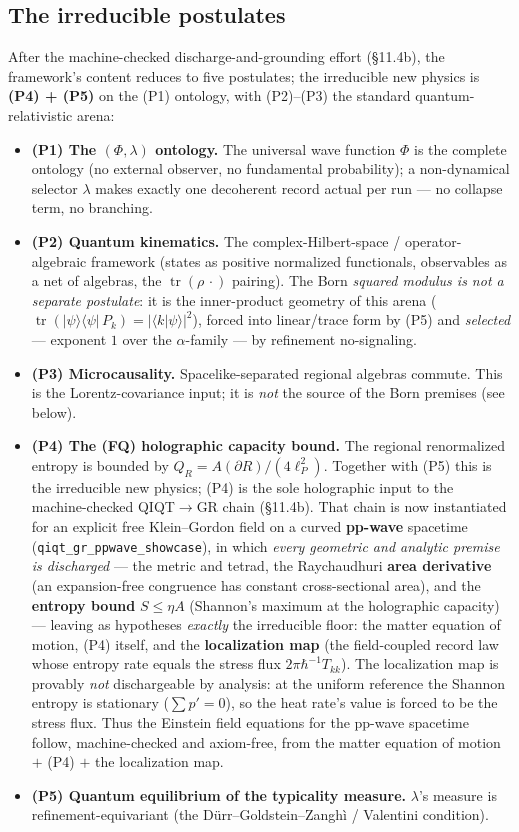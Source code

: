 \documentclass[11pt,a4paper]{article}
\begin{document}
\subsection{The irreducible postulates}

After the machine-checked discharge-and-grounding effort (§11.4b), the framework's content reduces to five postulates; the irreducible new physics is \textbf{(P4) + (P5)} on the (P1) ontology, with (P2)–(P3) the standard quantum-relativistic arena:

\begin{itemize}
  \item \textbf{(P1) The $(\Phi,\lambda)$ ontology.} The universal wave function $\Phi$ is the complete ontology (no external observer, no fundamental probability); a non-dynamical selector $\lambda$ makes exactly one decoherent record actual per run — no collapse term, no branching.
  \item \textbf{(P2) Quantum kinematics.} The complex-Hilbert-space / operator-algebraic framework (states as positive normalized functionals, observables as a net of algebras, the $\operatorname{tr}(\rho\,\cdot)$ pairing). The Born \emph{squared modulus is not a separate postulate}: it is the inner-product geometry of this arena ($\operatorname{tr}(|\psi\rangle\langle\psi|\,P_k)=|\langle k|\psi\rangle|^2$), forced into linear/trace form by (P5) and \emph{selected} — exponent $1$ over the $\alpha$-family — by refinement no-signaling.
  \item \textbf{(P3) Microcausality.} Spacelike-separated regional algebras commute. This is the Lorentz-covariance input; it is \emph{not} the source of the Born premises (see below).
  \item \textbf{(P4) The (FQ) holographic capacity bound.} The regional renormalized entropy is bounded by $Q_R = A(\partial R)/(4\ell_P^2)$. Together with (P5) this is the irreducible new physics; (P4) is the sole holographic input to the machine-checked QIQT$\to$GR chain (§11.4b). That chain is now instantiated for an explicit free Klein–Gordon field on a curved \textbf{pp-wave} spacetime (\texttt{qiqt\_gr\_ppwave\_showcase}), in which \emph{every geometric and analytic premise is discharged} — the metric and tetrad, the Raychaudhuri \textbf{area derivative} (an expansion-free congruence has constant cross-sectional area), and the \textbf{entropy bound} $S\le\eta A$ (Shannon's maximum at the holographic capacity) — leaving as hypotheses \emph{exactly} the irreducible floor: the matter equation of motion, (P4) itself, and the \textbf{localization map} (the field-coupled record law whose entropy rate equals the stress flux $2\pi\hbar^{-1}T_{kk}$). The localization map is provably \emph{not} dischargeable by analysis: at the uniform reference the Shannon entropy is stationary ($\sum p'=0$), so the heat rate's value is forced to be the stress flux. Thus the Einstein field equations for the pp-wave spacetime follow, machine-checked and axiom-free, from the matter equation of motion $+$ (P4) $+$ the localization map.
  \item \textbf{(P5) Quantum equilibrium of the typicality measure.} $\lambda$'s measure is refinement-equivariant (the Dürr–Goldstein–Zanghì / Valentini condition).
\end{itemize}
\end{document}
